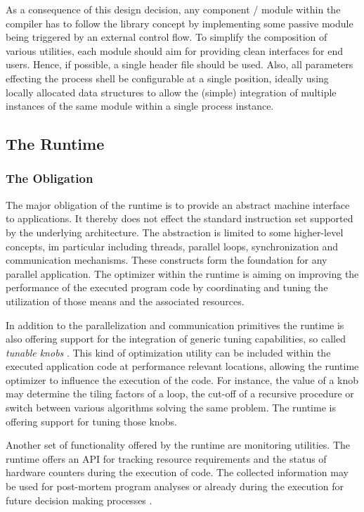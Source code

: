 As a consequence of this design decision, any component / module within the
compiler has to follow the library concept by implementing some passive module
being triggered by an external control flow. To simplify the composition of
various utilities, each module should aim for providing clean interfaces for end
users. Hence, if possible, a single header file should be used. Also, all
parameters effecting the process shell be configurable at a single position,
ideally using locally allocated data structures to allow the (simple)
integration of multiple instances of the same module within a single process
instance.


\subsection{The Runtime}

\subsubsection{The Obligation}
The major obligation of the runtime is to provide an abstract machine interface
to applications. It thereby does not effect the standard instruction set
supported by the underlying architecture. The abstraction is limited to some
higher-level concepts, im particular including threads, parallel loops,
synchronization and communication mechanisms. These constructs form the
foundation for any parallel application. The optimizer within the runtime is
aiming on improving the performance of the executed program code by coordinating
and tuning the utilization of those means and the associated resources.

In addition to the parallelization and communication primitives the runtime is
also offering support for the integration of generic tuning capabilities, so
called \textit{tunable knobs}  . This kind of optimization utility can be included within the
executed application code at performance relevant locations, allowing the
runtime optimizer to influence the execution of the code. For instance, the
value of a knob may determine the tiling factors of a loop, the cut-off of a
recursive procedure or switch between various algorithms solving the same
problem. The runtime is offering support for tuning those knobs. 

Another set of functionality offered by the runtime are monitoring utilities.
The runtime offers an API for tracking resource requirements and the status of
hardware counters during the execution of code. The collected information may be
used for post-mortem program analyses or already during the execution for future
decision making processes .

